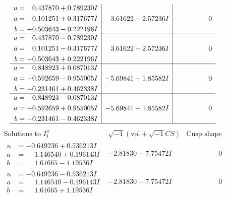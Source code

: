 \documentclass[1p]{elsarticle_modified}
\theoremstyle{definition}
\newcommand{\I}{\sqrt{-1}}
\begin{document}
$$\begin{array}{c|c|c}
\begin{aligned}
u &= \phantom{-}0.437870 + 0.789230 I \\
a &= \phantom{-}0.101251 + 0.317677 I \\
b &= -0.503643 - 0.222196 I\end{aligned}
 & \phantom{-}3.61622 - 2.57236 I & \phantom{-0.000000 } 0 \\ \hline\begin{aligned}
u &= \phantom{-}0.437870 - 0.789230 I \\
a &= \phantom{-}0.101251 - 0.317677 I \\
b &= -0.503643 + 0.222196 I\end{aligned}
 & \phantom{-}3.61622 + 2.57236 I & \phantom{-0.000000 } 0 \\ \hline\begin{aligned}
u &= \phantom{-}0.848923 + 0.087013 I \\
a &= -0.592659 - 0.955005 I \\
b &= -0.231461 + 0.462338 I\end{aligned}
 & -5.69841 + 1.85582 I & \phantom{-0.000000 } 0 \\ \hline\begin{aligned}
u &= \phantom{-}0.848923 - 0.087013 I \\
a &= -0.592659 + 0.955005 I \\
b &= -0.231461 - 0.462338 I\end{aligned}
 & -5.69841 - 1.85582 I & \phantom{-0.000000 } 0\\
 \hline 
 \end{array}$$\newpage$$\begin{array}{c|c|c}  
\text{Solutions to }I^u_{1}& \I (\text{vol} + \sqrt{-1}CS) & \text{Cusp shape}\\
 \hline 
\begin{aligned}
u &= -0.649236 + 0.536213 I \\
a &= \phantom{-}1.146540 + 0.196143 I \\
b &= \phantom{-}1.61665 - 1.19536 I\end{aligned}
 & -2.81830 + 7.75472 I & \phantom{-0.000000 } 0 \\ \hline\begin{aligned}
u &= -0.649236 - 0.536213 I \\
a &= \phantom{-}1.146540 - 0.196143 I \\
b &= \phantom{-}1.61665 + 1.19536 I\end{aligned}
 & -2.81830 - 7.75472 I & \phantom{-0.000000 } 0 \\ \hline\begin{aligned}

\end{aligned}
\end{array}$$
\end{document}
